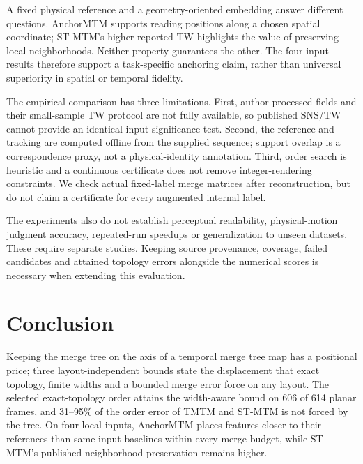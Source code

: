 \documentclass[review]{vgtc}
\begin{document}
A fixed physical reference and a geometry-oriented embedding answer different questions. AnchorMTM supports reading positions along a chosen spatial coordinate; ST-MTM's higher reported TW highlights the value of preserving local neighborhoods. Neither property guarantees the other. The four-input results therefore support a task-specific anchoring claim, rather than universal superiority in spatial or temporal fidelity.

The empirical comparison has three limitations. First, author-processed fields and their small-sample TW protocol are not fully available, so published SNS/TW cannot provide an identical-input significance test. Second, the reference and tracking are computed offline from the supplied sequence; support overlap is a correspondence proxy, not a physical-identity annotation. Third, order search is heuristic and a continuous certificate does not remove integer-rendering constraints. We check actual fixed-label merge matrices after reconstruction, but do not claim a certificate for every augmented internal label.

The experiments also do not establish perceptual readability, physical-motion judgment accuracy, repeated-run speedups or generalization to unseen datasets. These require separate studies. Keeping source provenance, coverage, failed candidates and attained topology errors alongside the numerical scores is necessary when extending this evaluation.
\section{Conclusion}
Keeping the merge tree on the axis of a temporal merge tree map has a positional price; three layout-independent bounds state the displacement that exact topology, finite widths and a bounded merge error force on any layout. The selected exact-topology order attains the width-aware bound on 606 of 614 planar frames, and 31--95\% of the order error of TMTM and ST-MTM is not forced by the tree. On four local inputs, AnchorMTM places features closer to their references than same-input baselines within every merge budget, while ST-MTM's published neighborhood preservation remains higher.
\FloatBarrier
\begingroup
{}


\endgroup
\end{document}
